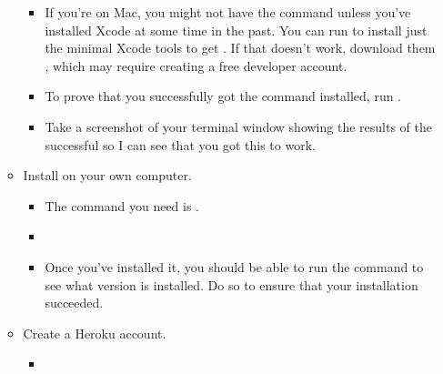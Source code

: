 \documentclass[letterpaper,10pt,english]{jupyterBook}
\begin{document}
\begin{itemize}
\begin{itemize}
\begin{itemize}
\item {} 
\sphinxAtStartPar
If you’re on Mac, you might not have the  command unless you’ve installed Xcode at some time in the past.  You can run  to install just the minimal Xcode tools to get .  If that doesn’t work, download them , which may require creating a free developer account.

\item {} 
\sphinxAtStartPar
To prove that you successfully got the  command installed, run .

\item {} 
\sphinxAtStartPar
Take a screenshot of your terminal window showing the results of the successful  so I can see that you got this to work.

\end{itemize}

\item {} 
\sphinxAtStartPar
Install  on your own computer.
\begin{itemize}
\item {} 
\sphinxAtStartPar
The command you need is .

\item {} 
\sphinxAtStartPar
{}

\item {} 
\sphinxAtStartPar
Once you’ve installed it, you should be able to run the command  to see what version is installed.  Do so to ensure that your installation succeeded.

\end{itemize}

\item {} 
\sphinxAtStartPar
Create a Heroku account.
\begin{itemize}
\item {} 
\sphinxAtStartPar
{}


\end{itemize}
\end{itemize}
\end{itemize}
\end{document}
